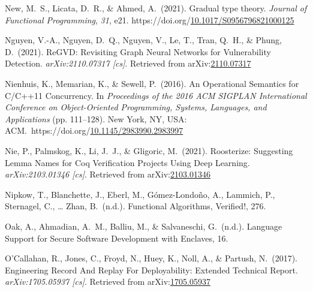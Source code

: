 \documentclass[12pt,twoside]{article}
\begin{document}
{\begin{thebibliography}{1079}
\mdbibitemlabel{}New, M.~S., Licata, D.~R., \& Ahmed, A.~(2021). Gradual type theory. \emph{Journal of Functional Programming}, \emph{31}, e21. https://doi.org/\href{https://dx.doi.org/10.1017/S0956796821000125}{10.1017/S0956796821000125}%

\mdbibitemlabel{}Nguyen, V.-A., Nguyen, D.~Q., Nguyen, V., Le, T., Tran, Q.~H., \& Phung, D.~(2021). ReGVD: Revisiting Graph Neural Networks for Vulnerability Detection. \emph{arXiv:2110.07317 {}[cs]}. Retrieved from arXiv:\href{http://arxiv.org/abs/2110.07317}{2110.07317}%

\mdbibitemlabel{}Nienhuis, K., Memarian, K., \& Sewell, P.~(2016). An Operational Semantics for C/C++11 Concurrency. In \emph{Proceedings of the 2016 ACM SIGPLAN International Conference on Object-Oriented Programming, Systems, Languages, and Applications} (pp. 111–128). New York, NY, USA: ACM.~https://doi.org/\href{https://dx.doi.org/10.1145/2983990.2983997}{10.1145/2983990.2983997}%

\mdbibitemlabel{}Nie, P., Palmskog, K., Li, J.~J., \& Gligoric, M.~(2021). Roosterize: Suggesting Lemma Names for Coq Verification Projects Using Deep Learning. \emph{arXiv:2103.01346 {}[cs]}. Retrieved from arXiv:\href{http://arxiv.org/abs/2103.01346}{2103.01346}%

\mdbibitemlabel{}Nipkow, T., Blanchette, J., Eberl, M., Gómez-Londoño, A., Lammich, P., Sternagel, C., … Zhan, B.~(n.d.). Functional Algorithms, Veriﬁed!, 276.%

\mdbibitemlabel{}Oak, A., Ahmadian, A.~M., Balliu, M., \& Salvaneschi, G.~(n.d.). Language Support for Secure Software Development with Enclaves, 16.%

\mdbibitemlabel{}O’Callahan, R., Jones, C., Froyd, N., Huey, K., Noll, A., \& Partush, N.~(2017). Engineering Record And Replay For Deployability: Extended Technical Report. \emph{arXiv:1705.05937 {}[cs]}. Retrieved from arXiv:\href{http://arxiv.org/abs/1705.05937}{1705.05937}%


\end{thebibliography}}
\end{document}
